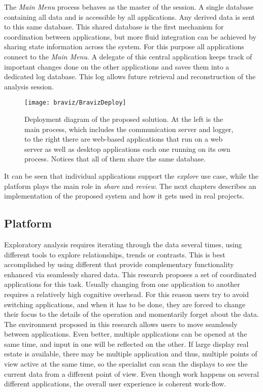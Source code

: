 The \emph{Main Menu} process behaves as the master of the session. A single database containing all data and is accessible by all applications. Any derived data is sent to this same database. This shared database is the first mechanism for coordination between applications, but more fluid integration can be achieved by sharing state information across the system. For this purpose all applications connect to the \emph{Main Menu}. A delegate of this central application keeps track of important changes done on the other applications and saves them into a dedicated log database. This log allows future retrieval and reconstruction of the analysis session.

\begin{figure}
\centering
\texttt{[image: braviz/BravizDeploy]}
\caption{\label{fig_deployment} Deployment diagram of the proposed solution. At the left is the main process, which includes the communication server and logger, to the right there are web-based applications that run on a web server as well as desktop applications each one running on its own process. Notices that all of them share the same database.}
\end{figure}
 
It can be seen that individual applications support the \emph{explore} use case, while the platform plays the main role in \emph{share} and \emph{review}. The next chapters describes an implementation of the proposed system and how it gets used in real projects.

\subsection{Platform}

Exploratory analysis requires iterating through the data several times, using different tools to explore relationships, trends or contrasts. This is best accomplished by using different that provide complementary functionality  enhanced via seamlessly shared data. This research proposes a set of coordinated applications for this task. Usually changing from one application to another requires a relatively high cognitive overhead. For this reason users try to avoid switching applications, and when it has to be done, they are forced to change their focus to the details of the operation and momentarily forget about the data. The environment proposed in this research allows users to move seamlessly between applications. Even better, multiple applications can be opened at the same time, and input in one will be reflected on the other. If large display real estate is available, there may be multiple application and thus, multiple  points of view active at the same time, so the specialist can scan the displays to see the current data from a different point of view. Even though work happens on several different applications, the overall user experience is coherent work-flow. 

